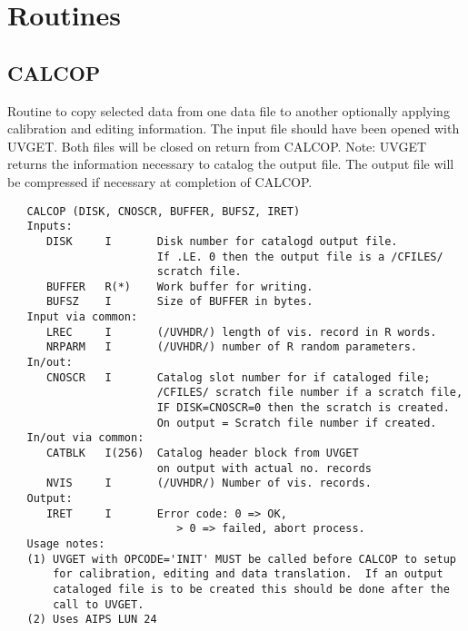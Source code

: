 \section{Routines}

\subsection{CALCOP}
Routine to copy selected data from one data file to another
optionally applying calibration and editing information.  The input
file should have been opened with UVGET.  Both files will be closed
on return from CALCOP.
  Note: UVGET returns the information necessary to catalog the
output file.  The output file will be compressed if necessary at
completion of CALCOP.
\begin{verbatim}
   CALCOP (DISK, CNOSCR, BUFFER, BUFSZ, IRET)
   Inputs:
      DISK     I       Disk number for catalogd output file.
                       If .LE. 0 then the output file is a /CFILES/
                       scratch file.
      BUFFER   R(*)    Work buffer for writing.
      BUFSZ    I       Size of BUFFER in bytes.
   Input via common:
      LREC     I       (/UVHDR/) length of vis. record in R words.
      NRPARM   I       (/UVHDR/) number of R random parameters.
   In/out:
      CNOSCR   I       Catalog slot number for if cataloged file;
                       /CFILES/ scratch file number if a scratch file,
                       IF DISK=CNOSCR=0 then the scratch is created.
                       On output = Scratch file number if created.
   In/out via common:
      CATBLK   I(256)  Catalog header block from UVGET
                       on output with actual no. records
      NVIS     I       (/UVHDR/) Number of vis. records.
   Output:
      IRET     I       Error code: 0 => OK,
                          > 0 => failed, abort process.
   Usage notes:
   (1) UVGET with OPCODE='INIT' MUST be called before CALCOP to setup
       for calibration, editing and data translation.  If an output
       cataloged file is to be created this should be done after the
       call to UVGET.
   (2) Uses AIPS LUN 24
\end{verbatim}

